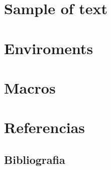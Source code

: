\documentclass[14pt,executivepaper]{extbook} %
\def \SourceRootPath{.}
\begin{document}
\part{Sample of text}



\part{Enviroments}




\part{Macros}







\part{Referencias}

\chapter*{Bibliografia}
\printbibliography[heading=bibempty]

\cleardoublepage
{}
\setlength{\columnsep}{0.75cm}
\printindex



\end{document}

